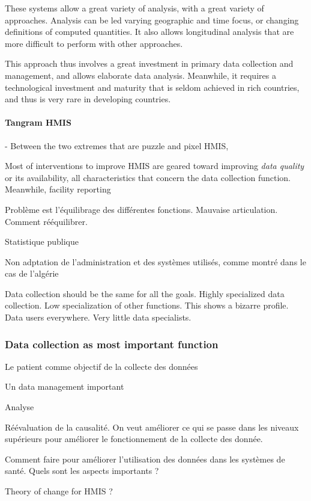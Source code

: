 \documentclass[a4paper,11pt,final,twoside]{article}
\begin{document}
These systems allow a great variety of analysis, with a great variety of approaches. Analysis can be led varying geographic and time focus, or changing definitions of computed quantities. It also allows longitudinal analysis that are more difficult to perform with other approaches. 

This approach thus involves a great investment in primary data collection and management, and allows elaborate data analysis. Meanwhile, it requires a technological investment and maturity that is seldom achieved in rich countries, and thus is very rare in developing countries. 

\paragraph{Tangram HMIS} - Between the two extremes that are puzzle and pixel HMIS, 


Most of interventions to improve HMIS are geared toward improving \textit{data quality} or its availability, all characteristics that concern the data collection function. Meanwhile, facility reporting 

Problème est l'équilibrage des différentes fonctions. Mauvaise articulation. Comment rééquilibrer.

Statistique publique

Non adptation de l'administration et des systèmes utilisés, comme montré dans le cas de l'algérie

Data collection should be the same for all the goals. Highly specialized data collection. Low specialization of other functions. This shows a bizarre profile. Data users everywhere. Very little data specialists.

\subsubsection{Data collection as most important function}
Le patient comme objectif de la collecte des données

Un data management important

Analyse

Réévaluation de la causalité. On veut améliorer ce qui se passe dans les niveaux supérieurs  pour améliorer le fonctionnement de la collecte des donnée. 

Comment faire pour améliorer l'utilisation des données dans les systèmes de santé. Quels sont les aspects importants ?

Theory of change for HMIS ?
\end{document}
